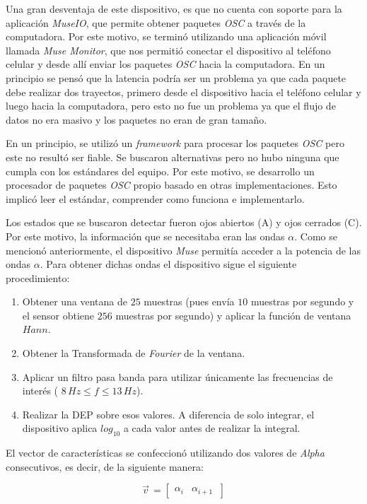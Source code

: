 Una gran desventaja de este dispositivo, es que no cuenta con soporte para la aplicación \emph{MuseIO}, que permite obtener paquetes \emph{OSC} a través de la computadora. Por este motivo, se terminó utilizando una aplicación móvil llamada \emph{Muse Monitor}, que nos permitió conectar el dispositivo al teléfono celular y desde allí enviar los paquetes \emph{OSC} hacia la computadora. En un principio se pensó que la latencia podría ser un problema ya que cada paquete debe realizar dos trayectos, primero desde el dispositivo hacia el teléfono celular y luego hacia la computadora, pero esto no fue un problema ya que el flujo de datos no era masivo y los paquetes no eran de gran tamaño.

En un principio, se utilizó un \emph{framework} para procesar los paquetes \emph{OSC} pero este no resultó ser fiable. Se buscaron alternativas pero no hubo ninguna que cumpla con los estándares del equipo. Por este motivo, se desarrollo un procesador de paquetes \emph{OSC} propio basado en otras implementaciones. Esto implicó leer el estándar, comprender como funciona e implementarlo.
 
 Los estados que se buscaron detectar fueron ojos abiertos (A) y ojos cerrados (C). Por este motivo, la información que se necesitaba eran las ondas $\alpha$. Como se mencionó anteriormente, el dispositivo \emph{Muse} permitía acceder a la potencia de las ondas $\alpha$. Para obtener dichas ondas el dispositivo sigue el siguiente procedimiento:
 
 \begin{enumerate}
 \item Obtener una ventana de $25$ muestras (pues envía $10$ muestras por segundo y el sensor obtiene $256$ muestras por segundo) y aplicar la función de ventana $Hann$.
 \item Obtener la Transformada de \emph{Fourier} de la ventana.
 \item Aplicar un filtro pasa banda para utilizar únicamente las frecuencias de interés ( $ 8 \, Hz \leq f \leq 13 \, Hz$).
 \item Realizar la DEP sobre esos valores. A diferencia de solo integrar, el dispositivo aplica $log_{10}$  a cada valor antes de realizar la integral.
 \end{enumerate}

El vector de características se confeccionó utilizando dos valores de \emph{Alpha} consecutivos, es decir, de la siguiente manera:

\[
  \vec{v}^{\, }=
  \left[ {\begin{array}{cc}
   \alpha_{i}  & \alpha_{i + 1}  \     \end{array} } \right]
\]


